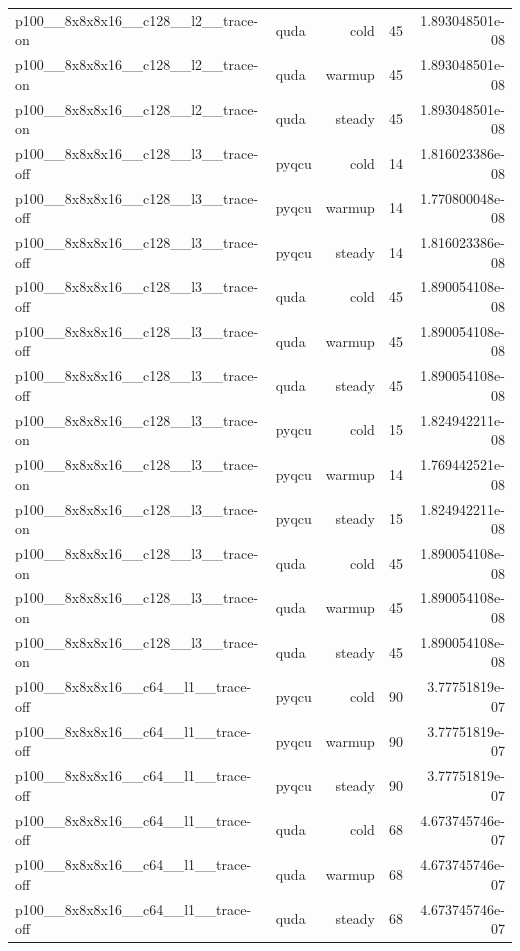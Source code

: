 \begin{table}[htbp]
\begin{tabular}{@{}llrrr@{}}
p100\_\_8x8x8x16\_\_c128\_\_l2\_\_trace-on & quda & cold & 45 & 1.893048501e-08 \\
p100\_\_8x8x8x16\_\_c128\_\_l2\_\_trace-on & quda & warmup & 45 & 1.893048501e-08 \\
p100\_\_8x8x8x16\_\_c128\_\_l2\_\_trace-on & quda & steady & 45 & 1.893048501e-08 \\
p100\_\_8x8x8x16\_\_c128\_\_l3\_\_trace-off & pyqcu & cold & 14 & 1.816023386e-08 \\
p100\_\_8x8x8x16\_\_c128\_\_l3\_\_trace-off & pyqcu & warmup & 14 & 1.770800048e-08 \\
p100\_\_8x8x8x16\_\_c128\_\_l3\_\_trace-off & pyqcu & steady & 14 & 1.816023386e-08 \\
p100\_\_8x8x8x16\_\_c128\_\_l3\_\_trace-off & quda & cold & 45 & 1.890054108e-08 \\
p100\_\_8x8x8x16\_\_c128\_\_l3\_\_trace-off & quda & warmup & 45 & 1.890054108e-08 \\
p100\_\_8x8x8x16\_\_c128\_\_l3\_\_trace-off & quda & steady & 45 & 1.890054108e-08 \\
p100\_\_8x8x8x16\_\_c128\_\_l3\_\_trace-on & pyqcu & cold & 15 & 1.824942211e-08 \\
p100\_\_8x8x8x16\_\_c128\_\_l3\_\_trace-on & pyqcu & warmup & 14 & 1.769442521e-08 \\
p100\_\_8x8x8x16\_\_c128\_\_l3\_\_trace-on & pyqcu & steady & 15 & 1.824942211e-08 \\
p100\_\_8x8x8x16\_\_c128\_\_l3\_\_trace-on & quda & cold & 45 & 1.890054108e-08 \\
p100\_\_8x8x8x16\_\_c128\_\_l3\_\_trace-on & quda & warmup & 45 & 1.890054108e-08 \\
p100\_\_8x8x8x16\_\_c128\_\_l3\_\_trace-on & quda & steady & 45 & 1.890054108e-08 \\
p100\_\_8x8x8x16\_\_c64\_\_l1\_\_trace-off & pyqcu & cold & 90 & 3.77751819e-07 \\
p100\_\_8x8x8x16\_\_c64\_\_l1\_\_trace-off & pyqcu & warmup & 90 & 3.77751819e-07 \\
p100\_\_8x8x8x16\_\_c64\_\_l1\_\_trace-off & pyqcu & steady & 90 & 3.77751819e-07 \\
p100\_\_8x8x8x16\_\_c64\_\_l1\_\_trace-off & quda & cold & 68 & 4.673745746e-07 \\
p100\_\_8x8x8x16\_\_c64\_\_l1\_\_trace-off & quda & warmup & 68 & 4.673745746e-07 \\
p100\_\_8x8x8x16\_\_c64\_\_l1\_\_trace-off & quda & steady & 68 & 4.673745746e-07 \\

\end{tabular}
\end{table}
